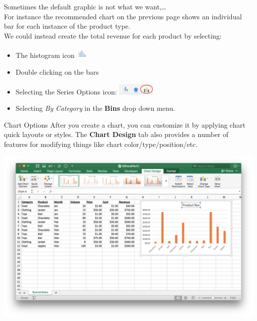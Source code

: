 \documentclass[xcolor=svgnames]{beamer}
\begin{document}
\begin{frame}
 Sometimes the default graphic is not what we want,\dots\\
 \medskip
 For instance the recommended chart on the previous page shows an individual bar for each instance of the product type.\\
 \medskip 
 We could instead create the total revenue for each product by selecting:
 \begin{itemize}
 \item The histogram icon \includegraphics[height=1.5em]{histicon}
 \item Double clicking on the bars
 \item Selecting the Series Options icon: \includegraphics[height=1.5em]{seriesopt}
 \item Selecting {\it By Category} in the {\bf Bins} drop down menu.
 \end{itemize}
 
 \end{frame}


\begin{frame}{Chart Options}
After you create a chart, you can customize it by applying chart quick layouts or styles.  The
\textbf{Chart Design} tab also provides a number of features for modifying things like chart color/type/position/etc.
 \begin{center}
  \includegraphics[width=.8\textwidth]{ChartTools2}
 \end{center}

\end{frame}
\end{document}
